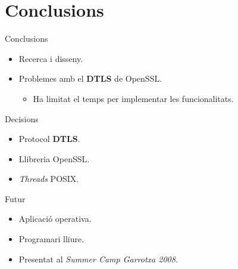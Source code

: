 \section{Conclusions}
    \begin{frame}{Conclusions}
        \begin{itemize}
\item Recerca i disseny.
\item \alert{Problemes} amb el \textbf{DTLS} de OpenSSL.
            \begin{itemize}
\item Ha limitat el temps per implementar les funcionalitats.
            \end{itemize}
        \end{itemize}
        \begin{exampleblock}{Decisions}
        \begin{itemize}
\item Protocol \textbf{DTLS}.
\item Llibreria OpenSSL.
\item \emph{Threads} POSIX.
        \end{itemize}
        \end{exampleblock}
        \begin{block}{Futur}
        \begin{itemize}
\item Aplicació operativa.
\item Programari lliure.
        \end{itemize}
        \end{block}
        \begin{itemize}
\item Presentat al \emph{Summer Camp Garrotxa 2008.}
        \end{itemize}
    \end{frame}
